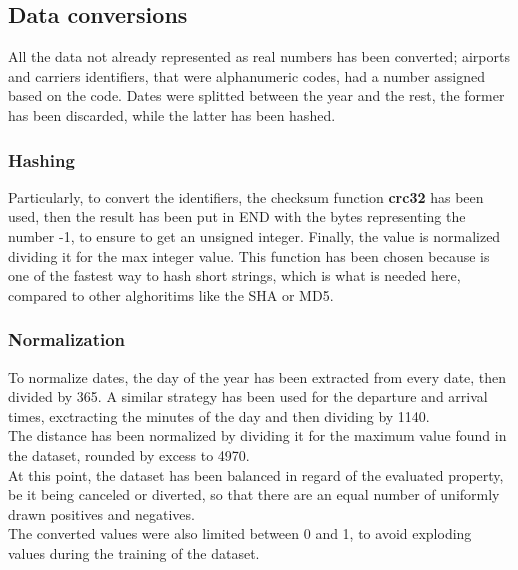 \documentclass[
	letterpaper, %
	10pt, %
]{class}
\begin{document}
\subsection{Data conversions}

All the data not already represented as real numbers has been converted; airports and carriers identifiers, that were alphanumeric codes, had a number assigned based on the code. Dates were splitted between the year and the rest, the former has been discarded, while the latter has been hashed.\\

\subsubsection{Hashing}

Particularly, to convert the identifiers, the checksum function \textbf{crc32} \cite{crc32} has been used, then the result has been put in END with the bytes representing the number -1, to ensure to get an unsigned integer. Finally, the value is normalized dividing it for the max integer value.
This function has been chosen because is one of the fastest way to hash short strings, which is what is needed here, compared to other alghoritims like the SHA or MD5.\\

\subsubsection{Normalization}

To normalize dates, the day of the year has been extracted from every date, then divided by 365. A similar strategy has been used for the departure and arrival times, exctracting the minutes of the day and then dividing by 1140.\\

The distance has been normalized by dividing it for the maximum value found in the dataset, rounded by excess to 4970.\\

At this point, the dataset has been balanced in regard of the evaluated property, be it being canceled or diverted, so that there are an equal number of uniformly drawn positives and negatives.\\

The converted values were also limited between 0 and 1, to avoid exploding values during the training of the dataset.\\
\end{document}
